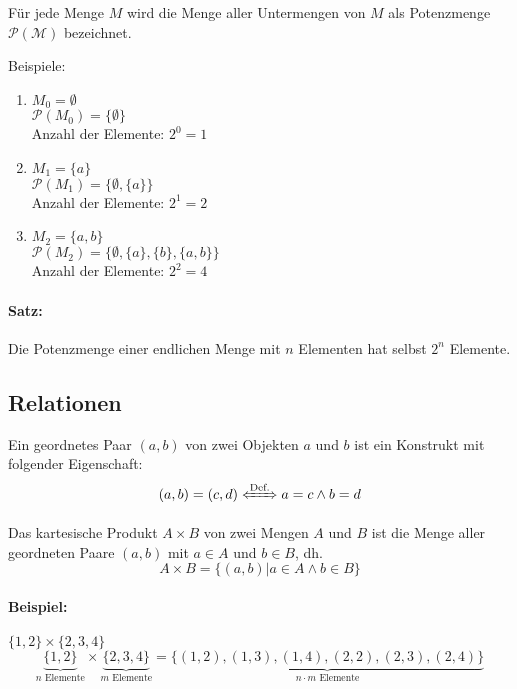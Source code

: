 \begin{defi}[Potenzmenge]
Für jede Menge $M$ wird die Menge aller Untermengen von $M$ als Potenzmenge $\mathcal{P(M)}$ bezeichnet.
\end{defi}

Beispiele:
\begin{enumerate}
\item $M_0=\emptyset$ \\
$\mathcal{P}(M_0)=\{\emptyset\}$ \\
Anzahl der Elemente: $2^0=1$
\item $M_1=\{a\}$\\
$\mathcal{P}(M_1)=\{\emptyset,\{a\}\}$ \\
Anzahl der Elemente: $2^1=2$
\item $M_2=\{a,b\}$ \\
$\mathcal{P}(M_2)=\{\emptyset,\{a\},\{b\},\{a,b\}\}$ \\
Anzahl der Elemente: $2^2=4$
\end{enumerate}

\paragraph{Satz:}Die Potenzmenge einer endlichen Menge mit $n$ Elementen hat selbst $2^n$ Elemente.

\subsection{Relationen}
\begin{defi}
Ein geordnetes Paar $(a,b)$ von zwei Objekten $a$ und $b$ ist ein Konstrukt mit folgender Eigenschaft:
\[
(a,b) = (c,d) \xLeftrightarrow{\text{Def.}} a=c \land b=d
\]
\end{defi}
\begin{defi}
Das kartesische Produkt $A\times B$ von zwei Mengen $A$ und $B$ ist die Menge aller geordneten Paare $(a,b)$ mit $a\in A$ und $b\in B$, dh.
\[
A\times B = \{(a,b) | a\in A \land b\in B\}
\]
\end{defi}
%
\paragraph{Beispiel:}$\{1,2\}\times \{2,3,4\}$
\[
\underbrace{ \{1,2\} }_{n\text{ Elemente}} \times \underbrace{ \{2,3,4\} }_{m\text{ Elemente}} = \underbrace{ \{ (1,2), (1,3), (1,4), (2,2), (2,3), (2,4) \} }_{n\cdot m\text{ Elemente}}
\]

